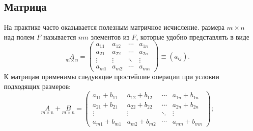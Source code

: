 \subsection{Матрица}
На практике часто оказывается полезным матричное исчисление.  размера $m \times n$ над полем $F$ называется $nm$ элементов из $F$, которые удобно представлять в виде 
    \begin{equation}
        \underset{m \times n}{A} =
        \begin{pmatrix}
            a_{11} & a_{12} & \cdots & a_{1n}\\
            a_{21} & a_{22} & \cdots & a_{2n}\\
            \vdots & \vdots & \ddots & \vdots\\
            a_{m1} & a_{m2} & \cdots & a_{mn}
        \end{pmatrix} \equiv (a_{ij}).
    \end{equation}
    К матрицам применимы следующие простейшие операции при условии подходящих размеров:
    \begin{equation}
    \underset{m \times n}{A} + \underset{m \times n}{B} =
    \begin{pmatrix}
        a_{11} + b_{11} & a_{12} + b_{12} & \cdots & a_{1n} +  b_{1n}\\
        a_{21} + b_{21} & a_{22} + b_{22}& \cdots & a_{2n} + b_{2n}\\
        \vdots & \vdots & \ddots & \vdots\\
        a_{m1} + b_{m1} & a_{m2} + b_{m2} & \cdots & a_{mn} +  b_{mn}
    \end{pmatrix};
    \end{equation}
